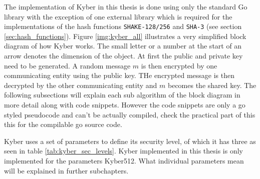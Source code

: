 The implementation of Kyber in this thesis is done using only the standard Go library with the exception of one external library \cite{00fV2cvg7Z6H2tS3} which is required for the implementations of the hash functions \texttt{SHAKE-128/256} and \texttt{SHA-3} (see section \ref{sec:hash_functions}). Figure \ref{img:kyber_all} illustrates a very simplified block diagram of how Kyber works. The small letter or a number at the start of an arrow denotes the dimension of the object. At first the public and private key need to be generated. A random message $m$ is then encrypted by one communicating entity using the public key. THe encrypted message is then decrypted by the other communicating entity and $m$ becomes the shared key. The following subsections will explain each sub algorithm of the block diagram in more detail along with code snippets. However the code snippets are only a go styled pseudocode and can't be actually compiled, check the practical part of this this for the compilable go source code.

Kyber uses a set of parameters to define its security level, of which it has three as seen in table \ref{tab:kyber_sec_levels}. Kyber implemented in this thesis is only implemented for the parameters Kyber512. What individual parameters mean will be explained in further subchapters.

